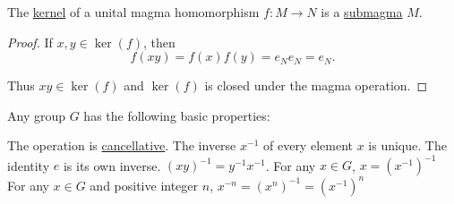 \begin{Proposition}\label{thm:unital_magma_kernel_is_submagma}
  The \hyperref[def:unital_magma_kernel]{kernel} of a unital magma homomorphism \( f: M \to N \) is a \hyperref[def:first_order_substructure]{submagma} \( M \).
\end{Proposition}
\begin{proof}
  If \( x, y \in \ker(f) \), then
  \begin{equation*}
    f(xy) = f(x) f(y) = e_N e_N = e_N.
  \end{equation*}

  Thus \( xy \in \ker(f) \) and \( \ker(f) \) is closed under the magma operation.
\end{proof}

\begin{Proposition}\label{thm:group_properties}
  Any group \( G \) has the following basic properties:
  \begin{PropEnum}
     The operation is \hyperref[def:algebraic_theory/cancellative]{cancellative}.
     The inverse \( x^{-1} \) of every element \( x \) is unique.
     The identity \( e \) is its own inverse.
     \( (xy)^{-1} = y^{-1} x^{-1} \).
     For any \( x \in G \), \( x = (x^{-1})^{-1} \)
     For any \( x \in G \) and positive integer \( n \), \( x^{-n} = (x^n)^{-1} = (x^{-1})^n \)
  \end{PropEnum}
\end{Proposition}
